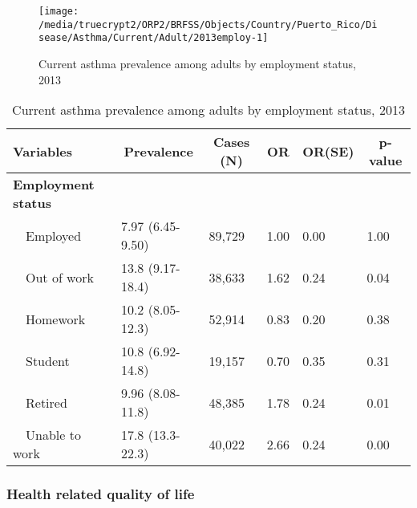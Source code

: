 \begin{figure}[H]
\caption{Current asthma prevalence among adults by employment status, 
         2013}
\label{fig:employ.Asthma.2013}
\begin{knitrout}
\color{fgcolor}

{\centering \texttt{[image: /media/truecrypt2/ORP2/BRFSS/Objects/Country/Puerto\_Rico/Disease/Asthma/Current/Adult/2013employ-1]} 

}



\end{knitrout}
 \end{figure}

\begin{table}[H]
\caption{Current asthma prevalence  among adults by employment status, 2013\label{tab:employ.Asthma.2013}} 
\begin{center}
\begin{tabular}{llllll}
\hline\hline
\multicolumn{1}{l}{Variables}&\multicolumn{1}{c}{Prevalence}&\multicolumn{1}{c}{Cases (N)}&\multicolumn{1}{c}{OR}&\multicolumn{1}{c}{OR(SE)}&\multicolumn{1}{c}{p-value}\tabularnewline
\hline
{\bfseries Employment status}&&&&&\tabularnewline
~~Employed&7.97 (6.45-9.50)&89,729&1.00&0.00&1.00\tabularnewline
~~Out of work&13.8 (9.17-18.4)&38,633&1.62&0.24&0.04\tabularnewline
~~Homework&10.2 (8.05-12.3)&52,914&0.83&0.20&0.38\tabularnewline
~~Student&10.8 (6.92-14.8)&19,157&0.70&0.35&0.31\tabularnewline
~~Retired&9.96 (8.08-11.8)&48,385&1.78&0.24&0.01\tabularnewline
~~Unable to work&17.8 (13.3-22.3)&40,022&2.66&0.24&0.00\tabularnewline
\hline
\end{tabular}\end{center}

\end{table}


 \newpage
\subsubsection{Health related quality of life}


